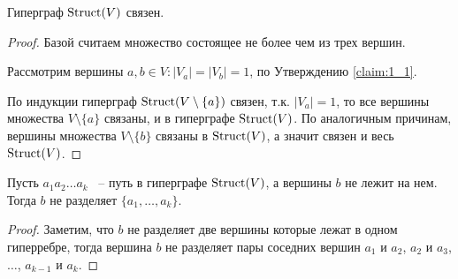 \begin{customclaim}{1.2} \label{claim:1_2}
	Гиперграф $\operatorname{Struct}(V)$ связен.
\end{customclaim}

\begin{proof}
	Базой считаем множество состоящее не более чем из трех вершин.

	Рассмотрим вершины $a, b \in V \colon |V_a| = |V_b| = 1$, по Утверждению \ref{claim:1_1}.

	По индукции гиперграф  $\operatorname{Struct}(V \setminus \{a\})$ связен, т.к. $|V_a| = 1$, то все вершины множества  $V \setminus \{a\}$ связаны, и в гиперграфе $\operatorname{Struct}(V)$.
	По аналогичным причинам, вершины множества $V \setminus \{b\}$ связаны в $\operatorname{Struct}(V)$, а значит связен и весь $\operatorname{Struct}(V)$.
\end{proof}

\begin{customclaim}{1.3} \label{claim:1_3}
	Пусть $a_1a_2 \ldots a_k$ ~-- путь в гиперграфе $\operatorname{Struct}(V)$, а вершины $b$ не лежит на нем. Тогда $b$ не разделяет $\{a_1, \ldots, a_k\}$.
\end{customclaim}

\begin{proof}
	Заметим, что $b$ не разделяет две вершины которые лежат в одном гиперребре, тогда вершина $b$ не разделяет пары соседних вершин $a_1$ и $a_2$, $a_2$ и $a_3$, $\ldots$,  $a_{k - 1}$ и  $a_k$.
\end{proof}

